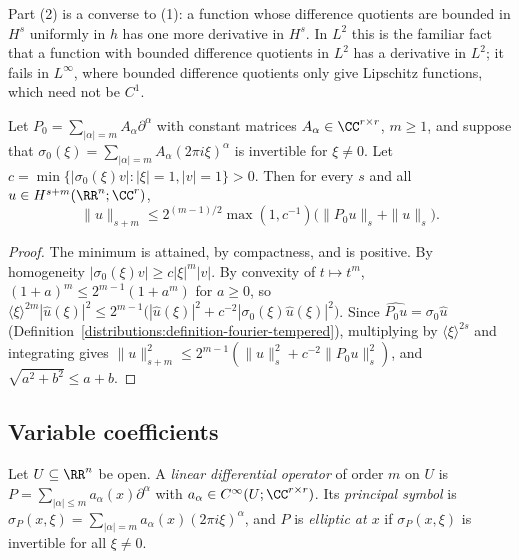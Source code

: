 Part (2) is a converse to (1): a function whose difference quotients are bounded in $H^s$ uniformly in $h$ has one more derivative in $H^s$. In $L^2$ this is the familiar fact that a function with
bounded difference quotients in $L^2$ has a derivative in $L^2$; it fails in $L^\infty$, where bounded difference quotients only give Lipschitz functions, which need not be $C^1$.

\begin{lemma}\label{distributions:lemma-constant-coefficients-rn}
Let $P_0 = \sum_{|\alpha| = m}A_\alpha\partial^\alpha$ with constant matrices $A_\alpha \in \CC^{r \times r}$, $m \geq 1$, and suppose that $\sigma_0(\xi) = \sum_{|\alpha| = m}A_\alpha(2\pi i\xi)^\alpha$ is invertible for $\xi \neq 0$.
Let $c = \min\{|\sigma_0(\xi)v| : |\xi| = 1, |v| = 1\} > 0$. Then for every $s$ and all $u \in H^{s+m}(\RR^n; \CC^r)$,
\[
\|u\|_{s+m} \leq 2^{(m-1)/2}\max(1, c^{-1})\bigl(\|P_0u\|_s + \|u\|_s\bigr).
\]
\end{lemma}

\begin{proof}
The minimum is attained, by compactness, and is positive. By homogeneity $|\sigma_0(\xi)v| \geq c|\xi|^m|v|$. By convexity of $t \mapsto t^m$, $(1 + a)^m \leq 2^{m-1}(1 + a^m)$ for $a \geq 0$, so
$\langle\xi\rangle^{2m}|\hat u(\xi)|^2 \leq 2^{m-1}\bigl(|\hat u(\xi)|^2 + c^{-2}|\sigma_0(\xi)\hat u(\xi)|^2\bigr)$. Since $\widehat{P_0u} = \sigma_0\hat u$ (Definition~\ref{distributions:definition-fourier-tempered}), multiplying by
$\langle\xi\rangle^{2s}$ and integrating gives $\|u\|_{s+m}^2 \leq 2^{m-1}(\|u\|_s^2 + c^{-2}\|P_0u\|_s^2)$, and $\sqrt{a^2 + b^2} \leq a + b$.
\end{proof}

\subsection{Variable coefficients}\label{distributions:subsection-variable-coefficients}

\begin{definition}\label{distributions:definition-elliptic-variable}
Let $U \subseteq \RR^n$ be open. A \emph{linear differential operator} of order $m$ on $U$ is $P = \sum_{|\alpha| \leq m}a_\alpha(x)\partial^\alpha$ with $a_\alpha \in C^\infty(U; \CC^{r \times r})$. Its \emph{principal symbol} is
$\sigma_P(x, \xi) = \sum_{|\alpha| = m}a_\alpha(x)(2\pi i\xi)^\alpha$, and $P$ is \emph{elliptic at $x$} if $\sigma_P(x, \xi)$ is invertible for all $\xi \neq 0$.
\end{definition}

